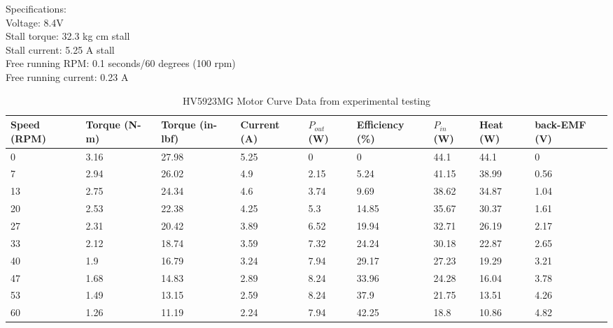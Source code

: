 \noindent
Specifications:\\
\noindent
\indent Voltage: 8.4V \\
\indent Stall torque: 32.3 kg cm stall \\
\indent Stall current: 5.25 A stall \\
\indent Free running RPM: 0.1 seconds/60 degrees (100 rpm) \\
\indent Free running current: 0.23 A \\





\begin{table} [H]
	\centering
	\caption{HV5923MG Motor Curve Data from experimental testing}
	\label{tab:MotorData}
	\begin{tabular}{|p{1cm}|p{1.2cm}|p{1.4cm}|p{1cm}|p{1cm}|p{1.5cm}|p{1cm}|p{1cm}|p{1.1cm}|}
		\hline
		Speed (RPM) & Torque (N-m) & Torque (in-lbf) & Current (A) & $P_{out}$ (W) & Efficiency (\%) & $P_{in}$ (W) & Heat (W) & back-EMF (V) \\
		\hline
		
		0 & 3.16 & 27.98 & 5.25 & 0 & 0 & 44.1 & 44.1 & 0 \\
		
		7 & 2.94 & 26.02 & 4.9 & 2.15 & 5.24 & 41.15 & 38.99 & 0.56 \\
		
		13 & 2.75 & 24.34 & 4.6 & 3.74 & 9.69 & 38.62 & 34.87 & 1.04 \\
		
		20 & 2.53 & 22.38 & 4.25 & 5.3 & 14.85 & 35.67 & 30.37 & 1.61 \\
		
		27 & 2.31 & 20.42 & 3.89 & 6.52 & 19.94 & 32.71 & 26.19 & 2.17 \\
		
		33 & 2.12 & 18.74 & 3.59 & 7.32 & 24.24 & 30.18 & 22.87 & 2.65 \\
		
		40 & 1.9 & 16.79 & 3.24 & 7.94 & 29.17 & 27.23 & 19.29 & 3.21 \\
		
		47 & 1.68 & 14.83 & 2.89 & 8.24 & 33.96 & 24.28 & 16.04 & 3.78 \\
		
		53 & 1.49 & 13.15 & 2.59 & 8.24 & 37.9 & 21.75 & 13.51 & 4.26 \\
		
		60 & 1.26 & 11.19 & 2.24 & 7.94 & 42.25 & 18.8 & 10.86 & 4.82 \\
		

\end{tabular}
\end{table}
